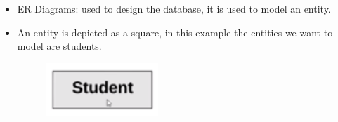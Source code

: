 \begin{itemize}
    \item ER Diagrams: used to design the database, it is used to model an entity.
    \item An entity is depicted as a square, in this example the entities we want to model are students.
        \begin{figure}[H]
            \centering
            \includegraphics[width=0.4\textwidth]{./Figs/2020-12-23-23-33-10.png}
        \end{figure}
        

\end{itemize}
